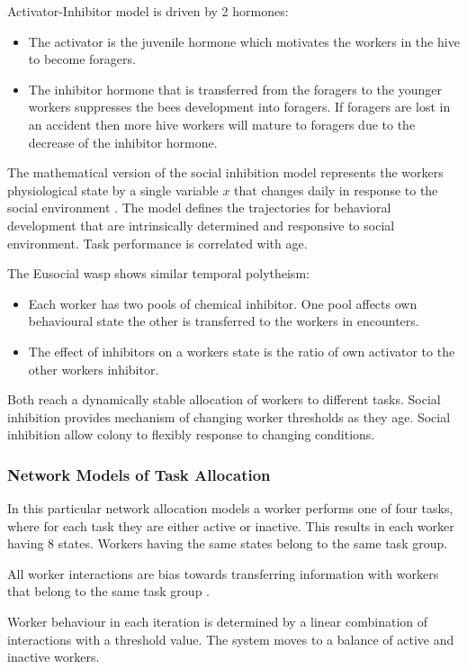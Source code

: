 Activator-Inhibitor model is driven by 2 hormones:
\begin{itemize}
	\item The activator is the juvenile hormone which motivates the workers in the hive to become foragers.
	\item The inhibitor hormone that is transferred from the foragers to the younger workers suppresses the bees development into foragers. If foragers are lost in an accident then more hive workers will mature to foragers due to the decrease of the inhibitor hormone.
\end{itemize}

The mathematical version of the social inhibition model represents the workers physiological state by a single variable $x$ that changes daily in response to the social environment \cite{beshers2001social}. The model defines the trajectories for behavioral development that are intrinsically determined and responsive to social environment. Task performance is correlated with age. 

The Eusocial wasp shows similar temporal polytheism:
\begin{itemize}
	\item Each worker has two pools of chemical inhibitor. One pool affects own behavioural state the other is transferred to the workers in encounters. 
	\item The effect of inhibitors on a workers state is the ratio of own activator to the other workers inhibitor.
\end{itemize}

Both reach a dynamically stable allocation of workers to different tasks. Social inhibition provides mechanism of changing worker thresholds as they age. Social inhibition allow colony to flexibly response to changing conditions.

\subsubsection{Network Models of Task Allocation}
In this particular network allocation models a worker performs one of four tasks, where for each task they are either active or inactive. This results in each worker having 8 states. Workers having the same states belong to the same task group.

All worker interactions are bias towards transferring information with workers that belong to the same task group \cite{gordon1992parallel}.

Worker behaviour in each iteration is determined by a linear combination of interactions with a threshold value. The system moves to a balance of active and inactive workers. 

